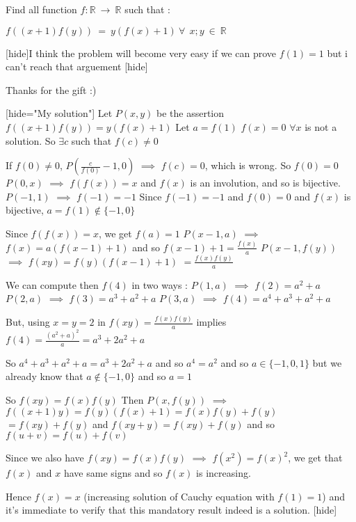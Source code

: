 \begin{solution}
	\begin{tcolorbox}\begin{italicized}Find all function $ f : \mathbb{R} \ \to \ \mathbb{R}$ such that :

   $ f((x + 1)f(y)) \ = \ y (f(x) + 1) \ \forall \ \ x ; y \ \in \ \mathbb{R}$

 [hide]I think the problem will become very easy if we can prove $ f(1) = 1$ but i can't reach that arguement [\/hide]\end{italicized}\end{tcolorbox}
Thanks for the gift :)

[hide="My solution"]
Let $ P(x,y)$ be the assertion $ f((x + 1)f(y)) = y(f(x) + 1)$
Let $ a = f(1)$
$ f(x) = 0$ $ \forall x$ is not a solution. So $ \exists c$ such that $ f(c)\neq 0$

If $ f(0)\neq 0$, $ P(\frac {c}{f(0)} - 1,0)$ $ \implies$ $ f(c) = 0$, which is wrong. So $ f(0) = 0$
$ P(0,x)$ $ \implies$ $ f(f(x)) = x$ and $ f(x)$ is an involution, and so is bijective.
$ P( - 1,1)$ $ \implies$ $ f( - 1) = - 1$
Since $ f( - 1) = - 1$ and $ f(0) = 0$ and $ f(x)$ is bijective, $ a = f(1)\notin\{ - 1,0\}$

Since $ f(f(x)) = x$, we get $ f(a) = 1$
$ P(x - 1,a)$ $ \implies$ $ f(x) = a(f(x - 1) + 1)$ and so $ f(x - 1) + 1 = \frac {f(x)}a$
$ P(x - 1,f(y))$ $ \implies$ $ f(xy) = f(y)(f(x - 1) + 1)$ $ = \frac {f(x)f(y)}{a}$

We can compute then $ f(4)$ in two ways :
$ P(1,a)$ $ \implies$ $ f(2) = a^2 + a$
$ P(2,a)$ $ \implies$ $ f(3) = a^3 + a^2 + a$
$ P(3,a)$ $ \implies$ $ f(4) = a^4 + a^3 + a^2 + a$

But, using $ x = y = 2$ in $ f(xy) = \frac {f(x)f(y)}{a}$ implies $ f(4) = \frac {(a^2 + a)^2}a = a^3 + 2a^2 + a$

So $ a^4 + a^3 + a^2 + a = a^3 + 2a^2 + a$ and so $ a^4 = a^2$ and so $ a\in\{ - 1,0,1\}$ but we already know that $ a\notin\{ - 1,0\}$ and so $ a = 1$

So $ f(xy) = f(x)f(y)$
Then $ P(x,f(y))$ $ \implies$ $ f((x + 1)y) = f(y)(f(x) + 1) = f(x)f(y) + f(y)$ $ = f(xy) + f(y)$ and $ f(xy + y) = f(xy) + f(y)$ and so $ f(u + v) = f(u) + f(v)$

Since we also have $ f(xy) = f(x)f(y)$ $ \implies$ $ f(x^2) = f(x)^2$, we get that $ f(x)$ and $ x$ have same signs and so $ f(x)$ is increasing.

Hence $ f(x) = x$ (increasing solution of Cauchy equation with $ f(1)=1$) and it's immediate to verify that this mandatory result indeed is a solution.
[\/hide]
\end{solution}



